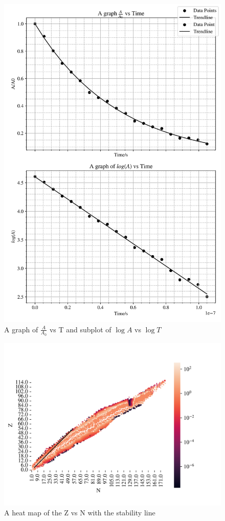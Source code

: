 \documentclass[12pt, a4paper]{article}
\begin{document}
\begin{figure}[H]
    \centering
    \includegraphics[width = \textwidth]{3Plot2.png}
    \caption{A graph of \(\frac{A}{A_0}\) vs T and subplot of \(\log{A}\) vs \(\log{T}\)}
\end{figure}

\begin{figure}[H]
    \centering
    \includegraphics[width = \textwidth]{3Plot3.png}
    \caption{A heat map of the Z vs N with the stability line}
\end{figure}
\end{document}
